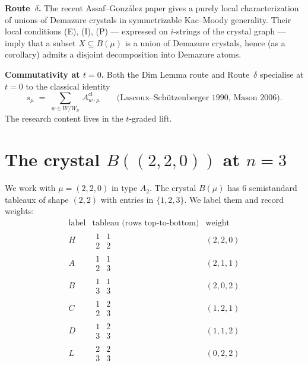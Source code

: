 \documentclass[11pt]{article}
\theoremstyle{definition}
\begin{document}
\medskip

\textbf{Route~$\delta$.} The recent Assaf--Gonz\'{a}lez paper \cite{AG2512} gives a purely local characterization of unions of Demazure crystals in symmetrizable Kac--Moody generality. Their local conditions (E), (I), (P) --- expressed on $i$-strings of the crystal graph --- imply that a subset $X \subseteq B(\mu)$ is a union of Demazure crystals, hence (as a corollary) admits a disjoint decomposition into Demazure atoms.

\medskip

\textbf{Commutativity at $t=0$.} Both the Dim Lemma route and Route~$\delta$ specialise at $t=0$ to the classical identity
\[
s_\mu \;=\; \sum_{w \in W/W_\mu}\, A^{\mathrm{cl}}_{w\cdot\mu}\qquad\text{(Lascoux--Sch\"{u}tzenberger 1990, Mason 2006)}.
\]
The research content lives in the $t$-graded lift.

\section{The crystal $B((2,2,0))$ at $n=3$}

We work with $\mu = (2,2,0)$ in type $A_2$. The crystal $B(\mu)$ has $6$ semistandard tableaux of shape $(2,2)$ with entries in $\{1,2,3\}$. We label them and record weights:
\[
\begin{array}{c|l|c}
\text{label} & \text{tableau (rows top-to-bottom)} & \text{weight} \\\hline
H & \begin{smallmatrix}1&1\\2&2\end{smallmatrix} & (2,2,0) \\
A & \begin{smallmatrix}1&1\\2&3\end{smallmatrix} & (2,1,1) \\
B & \begin{smallmatrix}1&1\\3&3\end{smallmatrix} & (2,0,2) \\
C & \begin{smallmatrix}1&2\\2&3\end{smallmatrix} & (1,2,1) \\
D & \begin{smallmatrix}1&2\\3&3\end{smallmatrix} & (1,1,2) \\
L & \begin{smallmatrix}2&2\\3&3\end{smallmatrix} & (0,2,2)
\end{array}
\]
\end{document}
